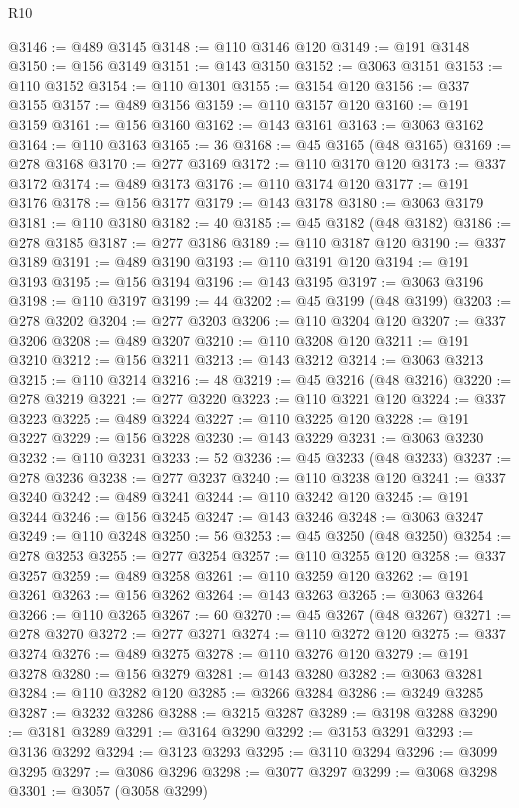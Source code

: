 \begin{lexlean}{R10}
\begin{coremodule}
@3146 := @489 @3145
@3148 := @110 @3146 @120
@3149 := @191 @3148
@3150 := @156 @3149
@3151 := @143 @3150
@3152 := @3063 @3151
@3153 := @110 @3152
@3154 := @110 @1301
@3155 := @3154 @120
@3156 := @337 @3155
@3157 := @489 @3156
@3159 := @110 @3157 @120
@3160 := @191 @3159
@3161 := @156 @3160
@3162 := @143 @3161
@3163 := @3063 @3162
@3164 := @110 @3163
@3165 := 36
@3168 := @45 @3165 (@48 @3165)
@3169 := @278 @3168
@3170 := @277 @3169
@3172 := @110 @3170 @120
@3173 := @337 @3172
@3174 := @489 @3173
@3176 := @110 @3174 @120
@3177 := @191 @3176
@3178 := @156 @3177
@3179 := @143 @3178
@3180 := @3063 @3179
@3181 := @110 @3180
@3182 := 40
@3185 := @45 @3182 (@48 @3182)
@3186 := @278 @3185
@3187 := @277 @3186
@3189 := @110 @3187 @120
@3190 := @337 @3189
@3191 := @489 @3190
@3193 := @110 @3191 @120
@3194 := @191 @3193
@3195 := @156 @3194
@3196 := @143 @3195
@3197 := @3063 @3196
@3198 := @110 @3197
@3199 := 44
@3202 := @45 @3199 (@48 @3199)
@3203 := @278 @3202
@3204 := @277 @3203
@3206 := @110 @3204 @120
@3207 := @337 @3206
@3208 := @489 @3207
@3210 := @110 @3208 @120
@3211 := @191 @3210
@3212 := @156 @3211
@3213 := @143 @3212
@3214 := @3063 @3213
@3215 := @110 @3214
@3216 := 48
@3219 := @45 @3216 (@48 @3216)
@3220 := @278 @3219
@3221 := @277 @3220
@3223 := @110 @3221 @120
@3224 := @337 @3223
@3225 := @489 @3224
@3227 := @110 @3225 @120
@3228 := @191 @3227
@3229 := @156 @3228
@3230 := @143 @3229
@3231 := @3063 @3230
@3232 := @110 @3231
@3233 := 52
@3236 := @45 @3233 (@48 @3233)
@3237 := @278 @3236
@3238 := @277 @3237
@3240 := @110 @3238 @120
@3241 := @337 @3240
@3242 := @489 @3241
@3244 := @110 @3242 @120
@3245 := @191 @3244
@3246 := @156 @3245
@3247 := @143 @3246
@3248 := @3063 @3247
@3249 := @110 @3248
@3250 := 56
@3253 := @45 @3250 (@48 @3250)
@3254 := @278 @3253
@3255 := @277 @3254
@3257 := @110 @3255 @120
@3258 := @337 @3257
@3259 := @489 @3258
@3261 := @110 @3259 @120
@3262 := @191 @3261
@3263 := @156 @3262
@3264 := @143 @3263
@3265 := @3063 @3264
@3266 := @110 @3265
@3267 := 60
@3270 := @45 @3267 (@48 @3267)
@3271 := @278 @3270
@3272 := @277 @3271
@3274 := @110 @3272 @120
@3275 := @337 @3274
@3276 := @489 @3275
@3278 := @110 @3276 @120
@3279 := @191 @3278
@3280 := @156 @3279
@3281 := @143 @3280
@3282 := @3063 @3281
@3284 := @110 @3282 @120
@3285 := @3266 @3284
@3286 := @3249 @3285
@3287 := @3232 @3286
@3288 := @3215 @3287
@3289 := @3198 @3288
@3290 := @3181 @3289
@3291 := @3164 @3290
@3292 := @3153 @3291
@3293 := @3136 @3292
@3294 := @3123 @3293
@3295 := @3110 @3294
@3296 := @3099 @3295
@3297 := @3086 @3296
@3298 := @3077 @3297
@3299 := @3068 @3298
@3301 := @3057 (@3058 @3299)

\end{coremodule}
\end{lexlean}
